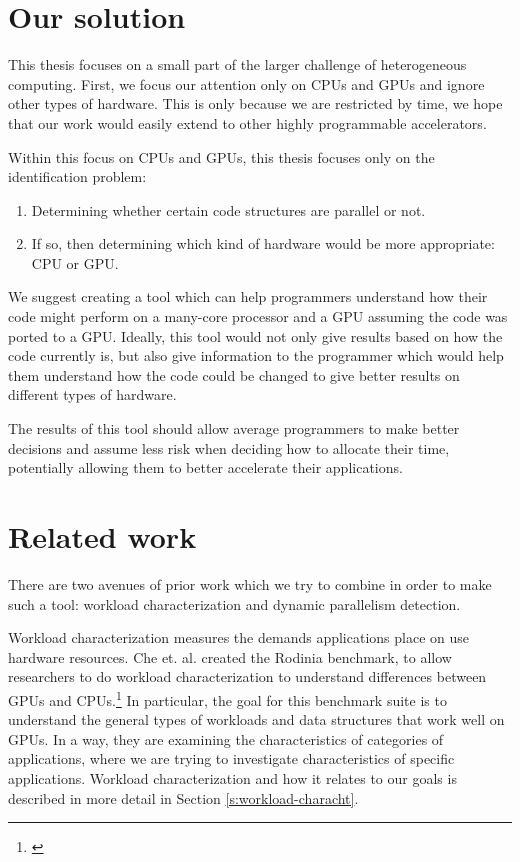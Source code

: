 \documentclass[12pt,twoside]{reedthesis}
\begin{document}
	\section{Our solution}
	
		This thesis focuses on a small part of the larger challenge of heterogeneous computing. First, we focus our attention only on CPUs and GPUs and ignore other types of hardware. This is only because we are restricted by time, we hope that our work would easily extend to other highly programmable accelerators.%
		
		
		Within this focus on CPUs and GPUs, this thesis focuses only on the identification problem: 
		
		\begin{enumerate}
			\item Determining whether certain code structures are parallel or not.
			\item If so, then determining which kind of hardware would be more appropriate: CPU or GPU. 
		\end{enumerate}
	
		We suggest creating a tool which can help programmers understand how their code might perform on a many-core processor and a GPU assuming the code was ported to a GPU. %
		Ideally, this tool would not only give results based on how the code currently is, but also give information to the programmer which would help them understand how the code could be changed to give better results on different types of hardware. 
		
		The results of this tool should allow average programmers to make better decisions and assume less risk when deciding how to allocate their time, potentially allowing them to better accelerate their applications. 
		
	\section{Related work}
	
		There are two avenues of prior work which we try to combine in order to make such a tool: workload characterization and dynamic parallelism detection. 
		
		Workload characterization measures the demands applications place on use hardware resources. Che et. al. created the Rodinia benchmark, to allow researchers to do workload characterization to understand differences between GPUs and CPUs.\footnote{\cite{Che:2010}} In particular, the goal for this benchmark suite is to understand the general types of workloads and data structures that work well on GPUs. In a way, they are examining the characteristics of categories of applications, where we are trying to investigate characteristics of specific applications. Workload characterization and how it relates to our goals is described in more detail in Section \ref{s:workload-characht}. 
		
\end{document}
